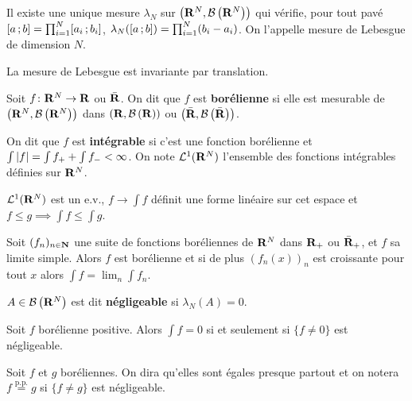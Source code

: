 \begin{thm}
	Il existe une unique mesure $\lambda_N$ sur $\left(\mathbf{R}^N,\mathcal{B}\left( \mathbf{R}^N \right) \right)$ qui vérifie, pour tout pavé $\mathopen{}\mathclose{\left[a\mathclose{}\mathpunct{};b\right]} = \prod_{i = 1}^N \mathopen{}\mathclose{\left[a_i\mathclose{}\mathpunct{};b_i\right]}$, $\lambda_N (\mathopen{}\mathclose{\left[a\mathclose{}\mathpunct{};b\right]}) = \prod_{i = 1}^N (b_i - a_i)$.
	On l'appelle mesure de Lebesgue de dimension $N$.
\end{thm}

\begin{pop}
	La mesure de Lebesgue est invariante par translation.
\end{pop}

\begin{defn}
	Soit $f \colon \mathbf{R}^N \to \mathbf{R}$ ou $\bar{\mathbf{R}}$.
	On dit que $f$ est \textbf{borélienne} si elle est mesurable de $\left(\mathbf{R}^N,\mathcal{B}\left( \mathbf{R}^N \right) \right)$ dans  $\left(\mathbf{R},\mathcal{B}\left( \mathbf{R} \right) \right)$ ou $\left(\bar{\mathbf{R}},\mathcal{B}\left( \bar{\mathbf{R}} \right) \right)$.
\end{defn}

\begin{defn}
	On dit que $f$ est \textbf{intégrable} si c'est une fonction borélienne et $\int \left\lvert f\right\rvert = \int f_+ + \int f_- < \infty$.
	On note $\mathcal{L}^1(\mathbf{R}^N)$ l'ensemble des fonctions intégrables définies sur $\mathbf{R}^N$.
\end{defn}

\begin{thm}
	$\mathcal{L}^1(\mathbf{R}^N)$ est un e.v., $f \to \int f$ définit une forme linéaire sur cet espace et $f \leq g \implies \int f \leq \int g$.
\end{thm}

\begin{thm}
	Soit $(f_n)_{n \in \mathbf{N}}$ une suite de fonctions boréliennes de $\mathbf{R}^N$ dans $\mathbf{R}_+$ ou $\bar{\mathbf{R}}_+$, et $f$ sa limite simple.
	Alors $f$ est borélienne et si de plus $(f_n(x))_n$ est croissante pour tout $x$ alors $\int f = \lim_n \int f_n$.
\end{thm}

\begin{defn}
	$A \in \mathcal{B}\left( \mathbf{R}^N \right)$ est dit \textbf{négligeable} si $\lambda_N(A) = 0$.
\end{defn}

\begin{lem}
	Soit $f$ borélienne positive.
	Alors $\int f = 0$ si et seulement si $\{ f \neq 0 \}$ est négligeable.
\end{lem}

\begin{defn}
	Soit $f$ et $g$ boréliennes.
	On dira qu'elles sont égales presque partout et on notera $f \overset{\text{p.p.}}{=} g$ si $\{ f \neq g \}$ est négligeable.
\end{defn}

